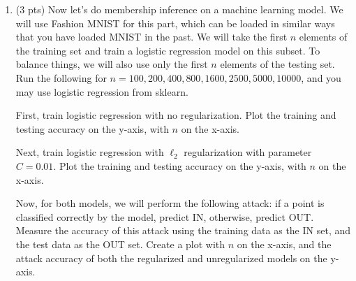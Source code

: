 \documentclass[10pt,letter,notitlepage]{article}
\newcounter{exercise}
\begin{document}
\begin{exercise}
\begin{enumerate}[label=\alph*)]
      We will now investigate an approach to protect against membership inference attacks.
      For the remainder of this part, fix $d = 50$.
      We will compute $X_1, \dots, X_n, Y_1, \dots, Y_n, \bar \mu$ as before, but additionally generate $\tilde \mu = \bar \mu + N(0, \sigma^2 I)$, where we will range $\sigma^2$ between $0$ and $1$.
      This will (roughly) inject differential privacy into the estimate $\tilde \mu$. 
      As in the first part, for each value of $\sigma^2$, determine the threshold $U_{\sigma^2}$ which maximizes the accuracy of the following algorithm: if $\langle Z, \tilde \mu \rangle \geq U_{\sigma^2}$ then predict IN, otherwise, predict OUT.
      Create two plots. 
      The first has $\sigma^2$ on the x-axis, and $\|\tilde \mu\|_2$ on the y-axis. 
      This measures the accuracy of the estimate: the smaller, the better.
      The second has $\sigma^2$ on the x-axis and the membership inference attack accuracy on the y-axis (once again, the lower the better).
      When generating these plots, the values will have rather high variance: independently repeat the computations for each value of $\sigma^2$ several times ($1000$ may be reasonable) to get better estimates.
      [Note again that this example is cheating, but it gives an upper bound on how well this attack could work.]

      Comment on all your findings as you present your results.


    \item (3 pts)
      Now let's do membership inference on a machine learning model. 
      We will use Fashion MNIST for this part, which can be loaded in similar ways that you have loaded MNIST in the past.
      We will take the first $n$ elements of the training set and train a logistic regression model on this subset.
      To balance things, we will also use only the first $n$ elements of the testing set.
      Run the following for $n = 100, 200, 400, 800, 1600, 2500, 5000, 10000$, and you may use logistic regression from sklearn.

      First, train logistic regression with no regularization. 
      Plot the training and testing accuracy on the y-axis, with $n$ on the x-axis. 

      Next, train logistic regression with $\ell_2$ regularization with parameter $C = 0.01$.
      Plot the training and testing accuracy on the y-axis, with $n$ on the x-axis. 

      Now, for both models, we will perform the following attack: if a point is classified correctly by the model, predict IN, otherwise, predict OUT.
      Measure the accuracy of this attack using the training data as the IN set, and the test data as the OUT set.
      Create a plot with $n$ on the x-axis, and the attack accuracy of both the regularized and unregularized models on the y-axis.


\end{enumerate}
\end{exercise}
\end{document}
